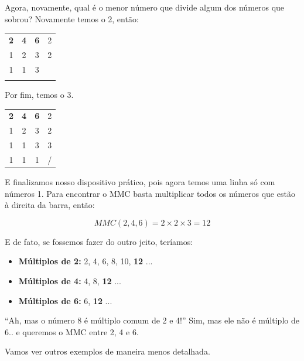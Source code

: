 \begin{exemplo}
    Agora, novamente, qual é o menor número que divide algum dos números que sobrou? Novamente temos o 2, então:

    \begin{table}[H]
    \centering
    \begin{tabular}{ccc|c}
        \textbf{2} & \textbf{4} & \textbf{6} & 2\\
         1 & 2 & 3 & 2\\
         1 & 1 & 3\\
         &  & \\
    \end{tabular}
    \end{table}

    Por fim, temos o 3.

    \begin{table}[H]
    \centering
    \begin{tabular}{ccc|c}
        \textbf{2} & \textbf{4} & \textbf{6} & 2\\
         1 & 2 & 3 & 2\\
         1 & 1 & 3 & 3\\
         1 & 1 & 1 & /\\
    \end{tabular}
    \end{table}

    E finalizamos nosso dispositivo prático, pois agora temos uma linha só com números 1. Para encontrar o MMC basta multiplicar todos os números que estão à direita da barra, então:

    \begin{equation}
        MMC(2,4,6)=2\times2\times3=12
    \end{equation}

    E de fato, se fossemos fazer do outro jeito, teríamos:

    \begin{itemize}
        \item \textbf{Múltiplos de 2:} 2, 4, 6, 8, 10, \textbf{12} ...
        \item \textbf{Múltiplos de 4:} 4, 8, \textbf{12} ...
        \item \textbf{Múltiplos de 6:} 6, \textbf{12} ...
    \end{itemize}

    ``Ah, mas o número 8 é múltiplo comum de 2 e 4!'' Sim, mas ele não é múltiplo de 6.. e queremos o MMC entre 2, 4 e 6.
\end{exemplo}

Vamos ver outros exemplos de maneira menos detalhada.

